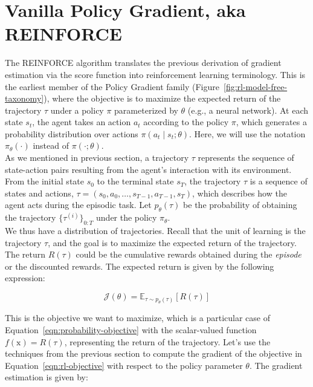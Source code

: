 \section{Vanilla Policy Gradient, aka REINFORCE}\label{sec:reinforce}

The REINFORCE algorithm \citep{williams1992simple} translates the previous 
derivation of gradient estimation via the score function into reinforcement learning terminology. This is the earliest member of the Policy Gradient family (Figure~\ref{fig:rl-model-free-taxonomy}), where the objective is to maximize the expected return of the trajectory $\tau$ under a policy $\pi$ parameterized by $\theta$ (e.g., a neural network). At each state $s_{t}$, the agent takes an action $a_{t}$ according to the policy $\pi$, which generates a probability distribution over actions $\pi(a_{t}\mid s_{t};\theta)$. Here, we will use the notation $\pi_{\theta}(\cdot)$ instead of $\pi(\cdot;\theta)$. \\

\noindent As we mentioned in previous section, a trajectory $\tau$ represents the sequence of state-action pairs resulting from the agent's interaction with its environment. From the initial state $s_{0}$ to the terminal state $s_{T}$, the trajectory $\tau$ is a sequence of states and actions, $\tau = (s_{0}, a_{0}, \dots, s_{T-1}, a_{T-1}, s_{T})$, which describes how the agent
acts during the episodic task. Let $p_{\theta}(\tau)$ be the
probability of obtaining the trajectory $\{\tau^{(i)}\}_{0:T}$ under the policy $\pi_{\theta}$. \\

\noindent We thus have a distribution of trajectories. Recall that the unit of learning is the trajectory $\tau$, and the goal is to maximize the expected return of the trajectory. The return $R(\tau)$ could be the cumulative rewards obtained during the \textit{episode} or the discounted rewards. The expected return is given by the following expression:

\begin{equation}\label{eqn:rl-objective}
    \mathcal{J}(\theta)=\mathbb{E}_{\tau\sim p_{\theta}(\tau)}[R(\tau)] 
\end{equation}

\noindent This is the objective we want to maximize, which is a 
particular case of Equation~\ref{eqn:probability-objective} with the
scalar-valued function $f(\mathrm{x}) = R(\tau)$, representing the return of the trajectory. Let's use the techniques from the previous section to compute the
gradient of the objective in Equation~\ref{eqn:rl-objective} with respect to the policy parameter $\theta$. The gradient estimation is given by:

